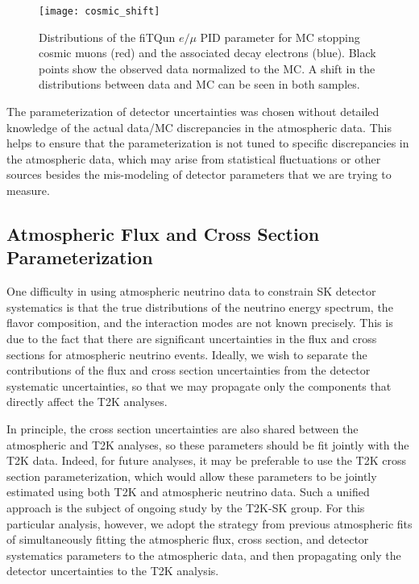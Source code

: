 \begin{figure}[hb]
  \begin{center}
    \texttt{[image: cosmic\_shift]}
  \end{center}
  \caption{Distributions of the fiTQun $e/\mu$ PID parameter for MC stopping
  cosmic muons (red) and the associated decay electrons (blue). Black points
  show the observed data normalized to the MC\@. A shift in the distributions
  between data and MC can be seen in both samples.}
  \label{fig:shift}
\end{figure}

The parameterization of detector uncertainties was chosen without detailed
knowledge of the actual data/MC discrepancies in the atmospheric data.  This
helps to ensure that the parameterization is not tuned to specific
discrepancies in the atmospheric data, which may arise from statistical
fluctuations or other sources besides the mis-modeling of detector parameters
that we are trying to measure.  



\subsection{Atmospheric Flux and Cross Section Parameterization}
\label{subsec:alphapar}

One difficulty in using atmospheric neutrino data to constrain SK detector
systematics is that the true distributions of the neutrino energy spectrum, the
flavor composition, and the interaction modes are not known precisely.  This is
due to the fact that there are significant uncertainties in the flux and cross
sections for atmospheric neutrino events.  Ideally, we wish to separate the
contributions of the flux and cross section uncertainties from the detector
systematic uncertainties, so that we may propagate only the components that
directly affect the T2K analyses. 

In principle, the cross section uncertainties are also shared between the
atmospheric and T2K analyses, so these parameters should be fit jointly with
the T2K data. Indeed, for future analyses, it may be preferable to use the T2K
cross section parameterization, which would allow these parameters to be
jointly estimated using both T2K and atmospheric neutrino data. Such a unified
approach is the subject of ongoing study by the T2K-SK group. For this
particular analysis, however, we adopt the strategy from previous atmospheric fits of
simultaneously fitting the atmospheric flux, cross section, and detector
systematics parameters to the atmospheric data, and then propagating only the
detector uncertainties to the T2K analysis. 

